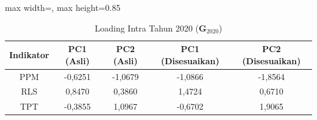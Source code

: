 \begin{table}[H]
\centering
\caption{Loading Intra Tahun 2020 ($\mathbf{G}_{2020}$)} \label{tab:sample2loading_intra_2020}
\begin{adjustbox}{max width=\textwidth, max height=0.85\textheight}
\begin{tabular}{|c|c|c|c|c|}
\hline
\textbf{Indikator} & \textbf{PC1 (Asli)} & \textbf{PC2 (Asli)} & \textbf{PC1 (Disesuaikan)} & \textbf{PC2 (Disesuaikan)} \\
\hline
PPM & -0,6251 & -1,0679 & -1,0866 & -1,8564 \\
RLS & 0,8470 & 0,3860 & 1,4724 & 0,6710 \\
TPT & -0,3855 & 1,0967 & -0,6702 & 1,9065 \\
\hline
\end{tabular}
\end{adjustbox}
\end{table}